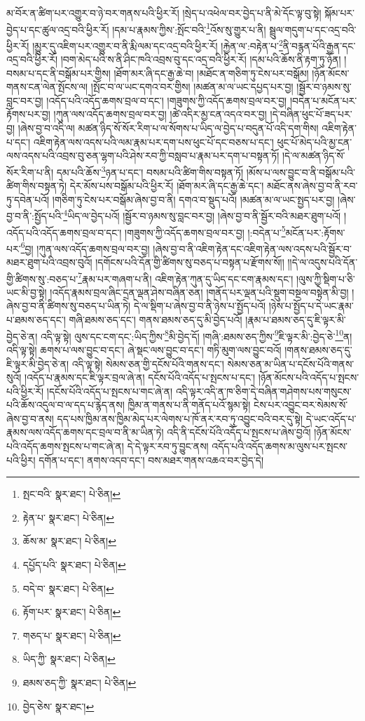 མ་བོར་ན་ཚིག་པར་འགྱུར་བ་ཉེ་བར་གནས་པའི་ཕྱིར་རོ། །སྲེད་པ་འཕེལ་བར་བྱེད་པ་ནི་མེ་དོང་ལྟ་བུ་སྟེ། སྐོམ་པར་བྱེད་པ་དང་ཚུལ་འདྲ་བའི་ཕྱིར་རོ། །དམ་པ་རྣམས་ཀྱིས་:སྤོང་བའི་\footnote{སྤང་བའི་  སྣར་ཐང་།  པེ་ཅིན། }འོས་སུ་གྱུར་པ་ནི། སྦྲུལ་གདུག་པ་དང་འདྲ་བའི་ཕྱིར་རོ། །མྱུར་དུ་འཇིག་པར་འགྱུར་བ་ནི་རྨི་ལམ་དང་འདྲ་བའི་ཕྱིར་རོ། །རྐྱེན་ལ་:བརྟེན་པ་\footnote{རྟེན་པ་  སྣར་ཐང་།  པེ་ཅིན། }ནི་བརྙན་པོའི་རྒྱན་དང་འདྲ་བའི་ཕྱིར་རོ། །བག་མེད་པའི་ས་ནི་ཤིང་ཁའི་འབྲས་བུ་དང་འདྲ་བའི་ཕྱིར་རོ། །དམ་པའི་ཆོས་ནི་རྟག་ཏུ་ཉོན། །
བསམ་པ་དང་ནི་བསྒོམ་པར་གྱིས། །ཐོག་མར་ཞི་དང་རྒྱ་ཆེ་བ། །མཐོང་ན་གཅིག་ཏུ་ངེས་པར་བསྒོམ། །ཉོན་མོངས་གནས་ངན་ལེན་སྤོངས་ལ། །སྤོང་བ་ལ་ཡང་དགའ་བར་གྱིས། །མཚན་མ་ལ་ཡང་དཔྱད་པར་བྱ། །སྦྱོར་བ་ཉམས་སུ་བླང་བར་བྱ། །འདོད་པའི་འདོད་ཆགས་བྲལ་བ་དང་། །གཟུགས་ཀྱི་འདོད་ཆགས་བྲལ་བར་བྱ། །བདེན་པ་མངོན་པར་རྟོགས་པར་བྱ། །ཀུན་ལས་འདོད་ཆགས་བྲལ་བར་བྱ། །ཚེ་འདིར་མྱ་ངན་འདའ་བར་བྱ། །དེ་བཞིན་ཕུང་པོ་ཟད་པར་བྱ། །ཞེས་བྱ་བ་འདི་ལ། མཚན་ཉིད་སོ་སོར་རིག་པ་ལ་སོགས་པ་ཡིད་ལ་བྱེད་པ་བདུན་པོ་འདི་དག་གིས། འཇིག་རྟེན་པ་དང་། འཇིག་རྟེན་ལས་འདས་པའི་ལམ་རྣམ་པར་དག་པས་ཕུང་པོ་དང་བཅས་པ་དང་། ཕུང་པོ་མེད་པའི་མྱ་ངན་ལས་འདས་པའི་འབྲས་བུ་ཅན་ལྷག་པའི་ཤེས་རབ་ཀྱི་བསླབ་པ་རྣམ་པར་དག་པ་བསྟན་ཏོ། །དེ་ལ་མཚན་ཉིད་སོ་སོར་རིག་པ་ནི། དམ་པའི་ཆོས་\footnote{ཆོས་མ་  སྣར་ཐང་།  པེ་ཅིན། }ཉན་པ་དང་། བསམ་པའི་ཚིག་གིས་བསྟན་ཏོ། །མོས་པ་ལས་བྱུང་བ་ནི་བསྒོམ་པའི་ཚིག་གིས་བསྟན་ཏེ། དེར་མོས་པས་བསྒོམ་པའི་ཕྱིར་རོ། །ཐོག་མར་ཞི་དང་རྒྱ་ཆེ་དང་། མཐོང་ནས་ཞེས་བྱ་བ་ནི་རབ་ཏུ་དབེན་པའོ། །གཅིག་ཏུ་ངེས་པར་བསྒོམ་ཞེས་བྱ་བ་ནི། དགའ་བ་སྡུད་པའོ། །མཚན་མ་ལ་ཡང་སྤྱད་པར་བྱ། །ཞེས་བྱ་བ་ནི་:སྤྱོད་པའི་\footnote{དཔྱོད་པའི་  སྣར་ཐང་།  པེ་ཅིན། }ཡིད་ལ་བྱེད་པའོ། །སྦྱོར་བ་ཉམས་སུ་བླང་བར་བྱ། །ཞེས་བྱ་བ་ནི་སྦྱོར་བའི་མཐར་ཐུག་པའོ། །འདོད་པའི་འདོད་ཆགས་བྲལ་བ་དང་། །གཟུགས་ཀྱི་འདོད་ཆགས་བྲལ་བར་བྱ། །:བདེན་པ་\footnote{བདེ་བ་  སྣར་ཐང་།  པེ་ཅིན། }མངོན་པར་:རྟོགས་པར་\footnote{རྟོག་པར་  སྣར་ཐང་།  པེ་ཅིན། }བྱ། །ཀུན་ལས་འདོད་ཆགས་བྲལ་བར་བྱ། །ཞེས་བྱ་བ་ནི་འཇིག་རྟེན་དང་འཇིག་རྟེན་ལས་འདས་པའི་སྦྱོར་བ་མཐར་ཐུག་པའི་འབྲས་བུའོ། །དགོངས་པའི་དོན་གྱི་ཚིགས་སུ་བཅད་པ་བསྟན་པ་རྫོགས་སོ།། །།དེ་ལ་འདུས་པའི་དོན་གྱི་ཚིགས་སུ་:བཅད་པ་\footnote{གཅད་པ་  སྣར་ཐང་།  པེ་ཅིན། }རྣམ་པར་གཞག་པ་ནི། འཇིག་རྟེན་ཀུན་དུ་ཡིད་དང་ངག་རྣམས་དང་། །ལུས་ཀྱི་སྡིག་པ་ཅི་ཡང་མི་བྱ་སྟེ། །འདོད་རྣམས་བྲལ་ཞིང་དྲན་ལྡན་ཤེས་བཞིན་ཅན། །གནོད་པར་ལྡན་པའི་སྡུག་བསྔལ་བསྟེན་མི་བྱ། །ཞེས་བྱ་བ་ནི་ཚིགས་སུ་བཅད་པ་ཡིན་ཏེ། དེ་ལ་སྡིག་པ་ཞེས་བྱ་བ་ནི་ཉེས་པ་སྤྱོད་པའོ། །ཉེས་པ་སྤྱོད་པ་དེ་ཡང་རྣམ་པ་ཐམས་ཅད་དང་། གཞི་ཐམས་ཅད་དང་། གནས་ཐམས་ཅད་དུ་མི་བྱེད་པའོ། །རྣམ་པ་ཐམས་ཅད་དུ་ཇི་ལྟར་མི་བྱེད་ཅེ་ན། འདི་ལྟ་སྟེ། ལུས་དང་ངག་དང་:ཡིད་ཀྱིས་\footnote{ཡིད་ཀྱི་  སྣར་ཐང་།  པེ་ཅིན། }མི་བྱེད་དོ། །གཞི་:ཐམས་ཅད་ཀྱིས་\footnote{ཐམས་ཅད་ཀྱི་  སྣར་ཐང་།  པེ་ཅིན། }ཇི་ལྟར་མི་:བྱེད་ཅེ་\footnote{བྱེད་ཅེས་  སྣར་ཐང་། }ན། འདི་ལྟ་སྟེ། ཆགས་པ་ལས་བྱུང་བ་དང་། ཞེ་སྡང་ལས་བྱུང་བ་དང་། གཏི་མུག་ལས་བྱུང་བའོ། །གནས་ཐམས་ཅད་དུ་ཇི་ལྟར་མི་བྱེད་ཅེ་ན། འདི་ལྟ་སྟེ། སེམས་ཅན་གྱི་དངོས་པོའི་གནས་དང་། སེམས་ཅན་མ་ཡིན་པ་དངོས་པོའི་གནས་སུའོ། །འདོད་པ་རྣམས་དང་ཇི་ལྟར་བྲལ་ཞེ་ན། དངོས་པོའི་འདོད་པ་སྤངས་པ་དང་། །ཉོན་མོངས་པའི་འདོད་པ་སྤངས་པའི་ཕྱིར་རོ། །དངོས་པོའི་འདོད་པ་སྤངས་པ་གང་ཞེ་ན། འདི་ལྟར་འདི་ན་ཁ་ཅིག་དེ་བཞིན་གཤེགས་པས་གསུངས་པའི་ཆོས་འདུལ་བ་ལ་དད་པ་རྙེད་ནས། ཁྱིམ་ན་གནས་པ་ནི་གནོད་པའོ་སྙམ་སྟེ། ངེས་པར་འབྱུང་བར་སེམས་སོ་ཞེས་བྱ་བ་ནས། དད་པས་ཁྱིམ་ནས་ཁྱིམ་མེད་པར་ལེགས་པ་ཁོ་ནར་རབ་ཏུ་འབྱུང་བའི་བར་དུ་སྟེ། དེ་ཡང་འདོད་པ་རྣམས་ལས་འདོད་ཆགས་དང་བྲལ་བ་ནི་མ་ཡིན་ཏེ། འདི་ནི་དངོས་པོའི་འདོད་པ་སྤངས་པ་ཞེས་བྱའོ། །ཉོན་མོངས་པའི་འདོད་ཆགས་སྤངས་པ་གང་ཞེ་ན། དེ་དེ་ལྟར་རབ་ཏུ་བྱུང་ནས། འདོད་པའི་འདོད་ཆགས་མ་ལུས་པར་སྤངས་པའི་ཕྱིར། དགོན་པ་དང་། ནགས་འདབ་དང་། བས་མཐར་གནས་འཆའ་བར་བྱེད་དེ། 